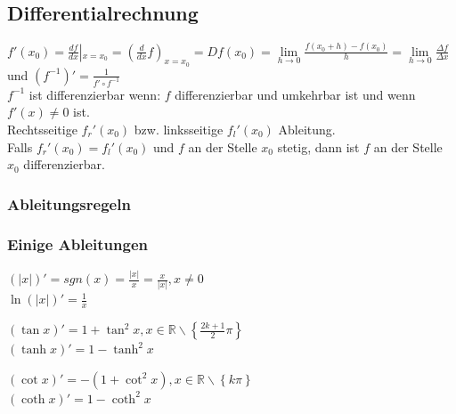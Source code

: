 \subsection{Differentialrechnung }
	$ f'(x_0) = \frac{df}{dx}\left|_{x=x_0}\right. = (\frac{d}{dx}f)_{x=x_0} = Df(x_0) = \lim\limits_{h \rightarrow 0} \frac{f(x_0+h) - f(x_0)}{h} = \lim\limits_{h \rightarrow 0} \frac{\Delta f}{\Delta x}$ und $ (f^{-1})' = \frac{1}{f' \circ f^{-1}}$\\
	$f^{-1}$ ist differenzierbar wenn: $f$ differenzierbar und umkehrbar ist und wenn $f'(x) \neq 0$ ist. \\
	Rechtsseitige $f_{r}'(x_0)$ bzw. linksseitige $f_{l}'(x_0)$ Ableitung.\\
	Falls $f_{r}'(x_0) = f_{l}'(x_0)$ und $f$ an der Stelle $x_0$ stetig, dann ist $f$ an der Stelle $x_0$ differenzierbar. 

\subsubsection{Ableitungsregeln }

\subsubsection{Einige Ableitungen }
	\begin{minipage}[t]{6cm} 		
		$(|x|)' = sgn(x) = \frac{|x|}{x} = \frac{x}{|x|}, x \neq 0$\\
		$\ln(|x|)' = \frac{1}{x}$
	\end{minipage} 
	\begin{minipage}[t]{6.5cm} 		
		$(\tan x)' = 1 + \tan^2{ }x , x \in \mathbb{R}\backslash \left\{ \frac{2k+1}{2}\pi \right\} $\\
		$(\tanh x)' = 1 - \tanh^2 x$ 
	\end{minipage} 
	\begin{minipage}[t]{6cm} 		
		$(\cot x)' = -(1 + \cot^2{ }x) , x \in \mathbb{R}\backslash \left\{ k\pi \right\} $\\
		$(\coth x)' = 1 - \coth ^2 x$
	\end{minipage} 

